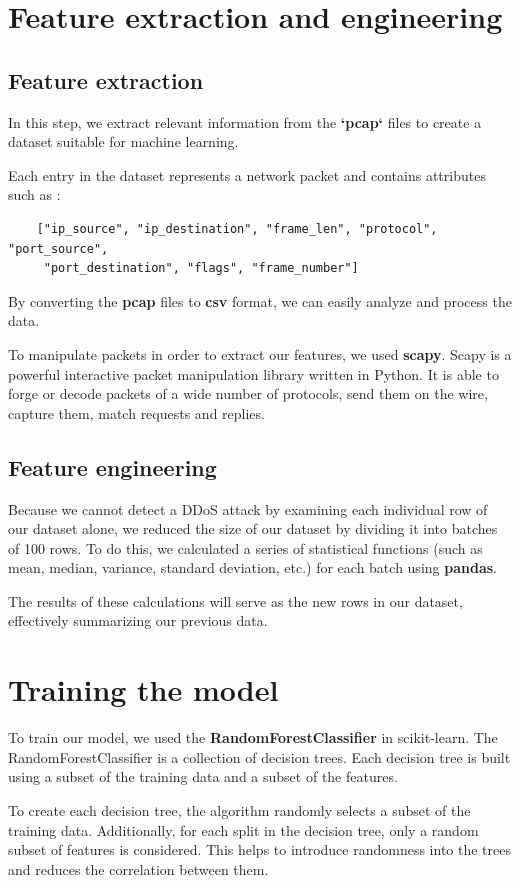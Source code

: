 \section{Feature extraction and engineering}
\subsection{Feature extraction}
In this step, we extract relevant information from the \textbf{`pcap`} files to create a dataset suitable for machine learning.

Each entry in the dataset represents a network packet and contains attributes such as :

\begin{verbatim}
	["ip_source", "ip_destination", "frame_len", "protocol", "port_source",
	 "port_destination", "flags", "frame_number"]
\end{verbatim}
By converting the \textbf{pcap} files to \textbf{csv} format, we can easily analyze and process the data.

To manipulate packets in order to extract our features, we used \textbf{scapy}. Scapy is a powerful interactive packet manipulation library written in Python. It is able to forge or decode packets of a wide number of protocols, send them on the wire, capture them, match requests and replies.
\subsection{Feature engineering}
Because we cannot detect a DDoS attack by examining each individual row of our dataset alone, we reduced the size of our dataset by dividing it into batches of 100 rows. To do this, we calculated a series of statistical functions (such as mean, median, variance, standard deviation, etc.) for each batch using \textbf{pandas}. 

The results of these calculations will serve as the new rows in our dataset, effectively summarizing our previous data.

\section{Training the model}
To train our model, we used the \textbf{RandomForestClassifier} in scikit-learn. 
The RandomForestClassifier is a collection of decision trees. Each decision tree is built using a subset of the training data and a subset of the features.

To create each decision tree, the algorithm randomly selects a subset of the training data. 
Additionally, for each split in the decision tree, only a random subset of features is considered. This helps to introduce randomness into the trees and reduces the correlation between them.

